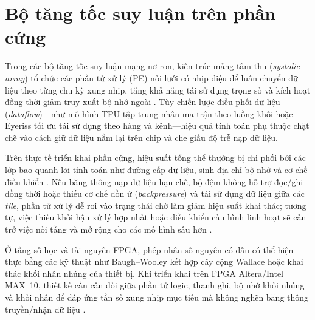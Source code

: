 \section{Bộ tăng tốc suy luận trên phần cứng}\label{sec:accel}

Trong các bộ tăng tốc suy luận mạng nơ-ron, kiến trúc mảng tâm thu (\emph{systolic array}) tổ chức các phần tử xử lý (PE) nối lưới có nhịp điệu để luân chuyển dữ liệu theo từng chu kỳ xung nhịp, tăng khả năng tái sử dụng trọng số và kích hoạt đồng thời giảm truy xuất bộ nhớ ngoài \cite{kung1982systolic}. Tùy chiến lược điều phối dữ liệu (\emph{dataflow})---như mô hình TPU \cite{jouppi2017tpu} tập trung nhân ma trận theo luồng khối hoặc Eyeriss \cite{chen2017eyeriss} tối ưu tái sử dụng theo hàng và kênh---hiệu quả tính toán phụ thuộc chặt chẽ vào cách giữ dữ liệu nằm lại trên chip và che giấu độ trễ nạp dữ liệu.

Trên thực tế triển khai phần cứng, hiệu suất tổng thể thường bị chi phối bởi các lớp bao quanh lõi tính toán như đường cấp dữ liệu, sinh địa chỉ bộ nhớ và cơ chế điều khiển \cite{hariri2026hardware}. Nếu băng thông nạp dữ liệu hạn chế, bộ đệm không hỗ trợ đọc/ghi đồng thời hoặc thiếu cơ chế dồn ứ (\emph{backpressure}) và tái sử dụng dữ liệu giữa các \emph{tile}, phần tử xử lý dễ rơi vào trạng thái chờ làm giảm hiệu suất khai thác; tương tự, việc thiếu khối hậu xử lý hợp nhất hoặc điều khiển cấu hình linh hoạt sẽ cản trở việc nối tầng và mở rộng cho các mô hình sâu hơn \cite{liu2025fpga1dcnn, liu2023fully}.

Ở tầng số học và tài nguyên FPGA, phép nhân số nguyên có dấu có thể hiện thực bằng các kỹ thuật như Baugh--Wooley \cite{baughwooley1973} kết hợp cây cộng Wallace \cite{wallace1964} hoặc khai thác khối nhân nhúng của thiết bị. Khi triển khai trên FPGA Altera/Intel MAX~10, thiết kế cần cân đối giữa phần tử logic, thanh ghi, bộ nhớ khối nhúng và khối nhân để đáp ứng tần số xung nhịp mục tiêu mà không nghẽn băng thông truyền/nhận dữ liệu \cite{hariri2026hardware, liu2025fpga1dcnn}.

